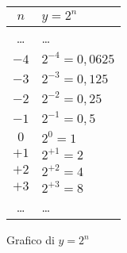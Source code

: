 \begin{figure}[h]
 \centering
 \begin{minipage}[]{.48\textwidth}
  \begin{center}
   \begin{tabular}{c|l}
    \(n\)   & \(y=2^n\) \\
    \hline
    \dots & \dots \\
    \(-4\) & \(2^{-4} = 0,0625\) \\
    \(-3\) & \(2^{-3} = 0,125\) \\
    \(-2\) & \(2^{-2} = 0,25\) \\
    \(-1\) & \(2^{-1} = 0,5\) \\
    \(0\) & \(2^{0} = 1\) \\
    \(+1\) & \(2^{+1} = 2\) \\
    \(+2\) & \(2^{+2} = 4\) \\
    \(+3\) & \(2^{+3} = 8\) \\
    \dots & \dots \\
   \end{tabular}
  \end{center}
 \end{minipage}
\begin{minipage}[]{.48\textwidth}
\begin{center}
\begin{inaccessibleblock}
  \puntia
  \caption{Grafico di \(y = 2^n\)} \label{fig:potdue0}
\end{inaccessibleblock}
\end{center}
\end{minipage}
\end{figure}

